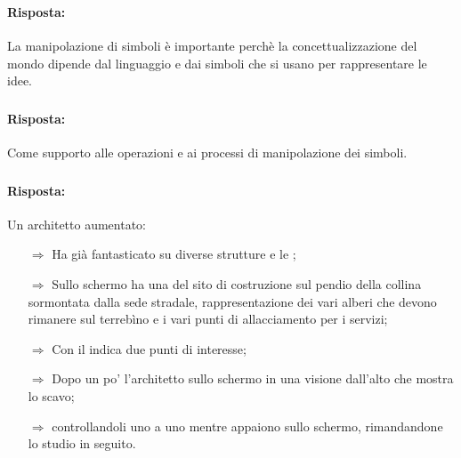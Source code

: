\subsubsection{}


\paragraph{Risposta:} La manipolazione di simboli è importante perchè la concettualizzazione del 
mondo dipende dal linguaggio e dai simboli che si usano per rappresentare le idee.

\subsubsection{}


\paragraph{Risposta:} Come supporto alle operazioni e ai processi di manipolazione dei simboli.

\subsubsection{}


\paragraph{Risposta:} Un architetto aumentato:

\begin{itemize}
    \item [$\Rightarrow$] Ha già fantasticato su diverse strutture e le ;
    \item [$\Rightarrow$] Sullo schermo ha una  del sito di costruzione sul 
    pendio della collina sormontata dalla sede stradale, rappresentazione dei vari alberi che devono rimanere
    sul terrebìno e i vari punti di allacciamento per i servizi;
    \item [$\Rightarrow$] Con il  indica due punti di interesse;
    \item [$\Rightarrow$] Dopo un po' l'architetto  sullo schermo in una visione dall'alto che mostra lo scavo;
    \item [$\Rightarrow$]  controllandoli uno a uno mentre appaiono sullo schermo, rimandandone lo studio in seguito.
\end{itemize}

